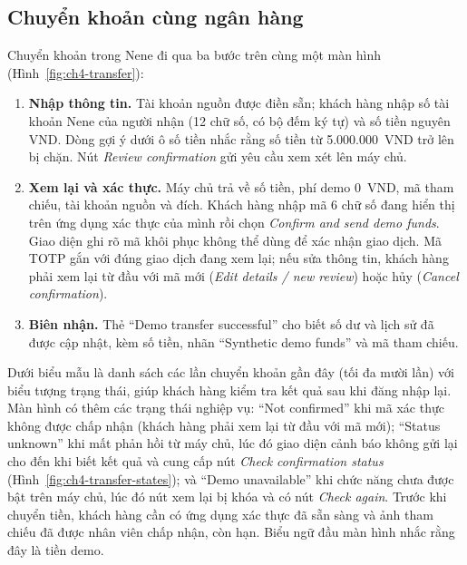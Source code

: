 \subsection{Chuyển khoản cùng ngân hàng}
\label{sec:ch4-transfer}

Chuyển khoản trong Nene đi qua ba bước trên cùng một màn hình (Hình~\ref{fig:ch4-transfer}):
\begin{enumerate}
  \item \textbf{Nhập thông tin.} Tài khoản nguồn được điền sẵn; khách hàng nhập số tài khoản Nene của người nhận (12 chữ số, có bộ đếm ký tự) và số tiền nguyên VND. Dòng gợi ý dưới ô số tiền nhắc rằng số tiền từ 5.000.000~VND trở lên bị chặn. Nút \textit{Review confirmation} gửi yêu cầu xem xét lên máy chủ.
  \item \textbf{Xem lại và xác thực.} Máy chủ trả về số tiền, phí demo 0~VND, mã tham chiếu, tài khoản nguồn và đích. Khách hàng nhập mã 6 chữ số đang hiển thị trên ứng dụng xác thực của mình rồi chọn \textit{Confirm and send demo funds}. Giao diện ghi rõ mã khôi phục không thể dùng để xác nhận giao dịch. Mã TOTP \parencite{ch2-rfc6238} gắn với đúng giao dịch đang xem lại; nếu sửa thông tin, khách hàng phải xem lại từ đầu với mã mới (\textit{Edit details / new review}) hoặc hủy (\textit{Cancel confirmation}).
  \item \textbf{Biên nhận.} Thẻ ``Demo transfer successful'' cho biết số dư và lịch sử đã được cập nhật, kèm số tiền, nhãn ``Synthetic demo funds'' và mã tham chiếu.
\end{enumerate}

Dưới biểu mẫu là danh sách các lần chuyển khoản gần đây (tối đa mười lần) với biểu tượng trạng thái, giúp khách hàng kiểm tra kết quả sau khi đăng nhập lại. Màn hình có thêm các trạng thái nghiệp vụ: ``Not confirmed'' khi mã xác thực không được chấp nhận (khách hàng phải xem lại từ đầu với mã mới); ``Status unknown'' khi mất phản hồi từ máy chủ, lúc đó giao diện cảnh báo không gửi lại cho đến khi biết kết quả và cung cấp nút \textit{Check confirmation status} (Hình~\ref{fig:ch4-transfer-states}); và ``Demo unavailable'' khi chức năng chưa được bật trên máy chủ, lúc đó nút xem lại bị khóa và có nút \textit{Check again}. Trước khi chuyển tiền, khách hàng cần có ứng dụng xác thực đã sẵn sàng và ảnh tham chiếu đã được nhân viên chấp nhận, còn hạn. Biểu ngữ đầu màn hình nhắc rằng đây là tiền demo.

